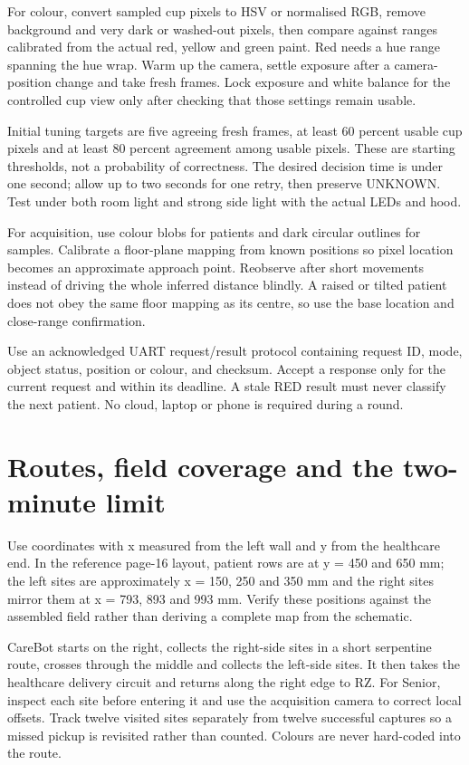 \documentclass[10pt,a4paper]{article}
\begin{document}
For colour, convert sampled cup pixels to HSV or normalised RGB, remove background and very dark or washed-out pixels, then compare against ranges calibrated from the actual red, yellow and green paint. Red needs a hue range spanning the hue wrap. Warm up the camera, settle exposure after a camera-position change and take fresh frames. Lock exposure and white balance for the controlled cup view only after checking that those settings remain usable.

Initial tuning targets are five agreeing fresh frames, at least 60 percent usable cup pixels and at least 80 percent agreement among usable pixels. These are starting thresholds, not a probability of correctness. The desired decision time is under one second; allow up to two seconds for one retry, then preserve UNKNOWN. Test under both room light and strong side light with the actual LEDs and hood.

For acquisition, use colour blobs for patients and dark circular outlines for samples. Calibrate a floor-plane mapping from known positions so pixel location becomes an approximate approach point. Reobserve after short movements instead of driving the whole inferred distance blindly. A raised or tilted patient does not obey the same floor mapping as its centre, so use the base location and close-range confirmation.

Use an acknowledged UART request/result protocol containing request ID, mode, object status, position or colour, and checksum. Accept a response only for the current request and within its deadline. A stale RED result must never classify the next patient. No cloud, laptop or phone is required during a round.

\section{Routes, field coverage and the two-minute limit}
Use coordinates with x measured from the left wall and y from the healthcare end. In the reference page-16 layout, patient rows are at y = 450 and 650 mm; the left sites are approximately x = 150, 250 and 350 mm and the right sites mirror them at x = 793, 893 and 993 mm. Verify these positions against the assembled field rather than deriving a complete map from the schematic.

CareBot starts on the right, collects the right-side sites in a short serpentine route, crosses through the middle and collects the left-side sites. It then takes the healthcare delivery circuit and returns along the right edge to RZ. For Senior, inspect each site before entering it and use the acquisition camera to correct local offsets. Track twelve visited sites separately from twelve successful captures so a missed pickup is revisited rather than counted. Colours are never hard-coded into the route.
\end{document}
